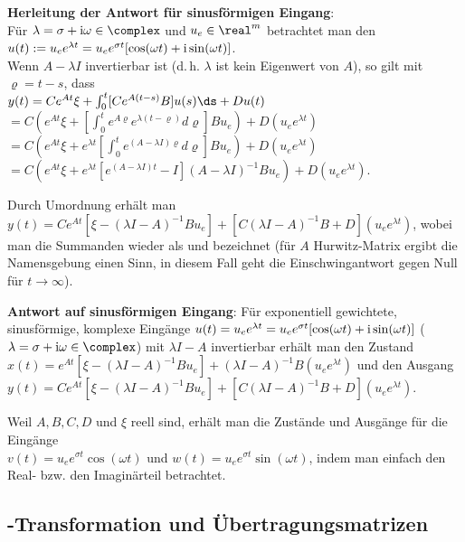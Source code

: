 \textbf{Herleitung der Antwort für sinusförmigen Eingang}:\\
Für $\lambda = \sigma + \iu\omega \in \complex$ und $u_e \in \real^m$ betrachtet man den \\
$u(t) := u_e e^{\lambda t} = u_e e^{\sigma t} [\cos(\omega t) + \text{i} \sin(\omega t)]$.\\
Wenn $A - \lambda I$ invertierbar ist (d.\,h. $\lambda$ ist kein Eigenwert von $A$), so gilt
mit $\varrho = t - s$, dass\\
$y(t) = Ce^{At} \xi + \int_0^t [Ce^{A(t - s)} B]u(s) \ds + Du(t)$\\
$= C \left(e^{At} \xi +
\left[\int_0^t e^{A\varrho} e^{\lambda (t - \varrho)} d\varrho\right] Bu_e\right) +
D (u_e e^{\lambda t})$\\
$= C \left(e^{At} \xi + e^{\lambda t}
\left[\int_0^t e^{(A - \lambda I) \varrho} d\varrho\right] Bu_e\right) + D (u_e e^{\lambda t})$\\
$= C \left(e^{At} \xi +
e^{\lambda t} \left[e^{(A - \lambda I)t} - I\right] (A - \lambda I)^{-1} B u_e\right) +
D (u_e e^{\lambda t})$.

Durch Umordnung erhält man
$y(t) = Ce^{At} [\xi - (\lambda I - A)^{-1} Bu_e] +
[C (\lambda I - A)^{-1} B + D] (u_e e^{\lambda t})$,
wobei man die Summanden wieder als  und 
bezeichnet
(für $A$ Hurwitz-Matrix ergibt die Namensgebung einen Sinn, in diesem Fall geht die
Einschwingantwort gegen Null für $t \to \infty$).

\textbf{Antwort auf sinusförmigen Eingang}:
Für exponentiell gewichtete, sinusförmige, komplexe Eingänge
$u(t) = u_e e^{\lambda t} = u_e e^{\sigma t} [\cos(\omega t) + \text{i} \sin(\omega t)]$
($\lambda = \sigma + \iu \omega \in \complex$) mit $\lambda I - A$ invertierbar erhält man den
Zustand $x(t) = e^{At} [\xi - (\lambda I - A)^{-1} Bu_e] +
(\lambda I - A)^{-1} B (u_e e^{\lambda t})$ und den Ausgang
$y(t) = C e^{At} [\xi - (\lambda I - A)^{-1} Bu_e] +
[C (\lambda I - A)^{-1} B + D] (u_e e^{\lambda t})$.

Weil $A, B, C, D$ und $\xi$ reell sind, erhält man die Zustände und Ausgänge für
die Eingänge\\
$v(t) = u_e e^{\sigma t} \cos(\omega t)$ und $w(t) = u_e e^{\sigma t} \sin(\omega t)$,
indem man einfach den Real- bzw. den Imaginärteil betrachtet.

\pagebreak

\subsection{%
    -Transformation und Übertragungsmatrizen%
}

